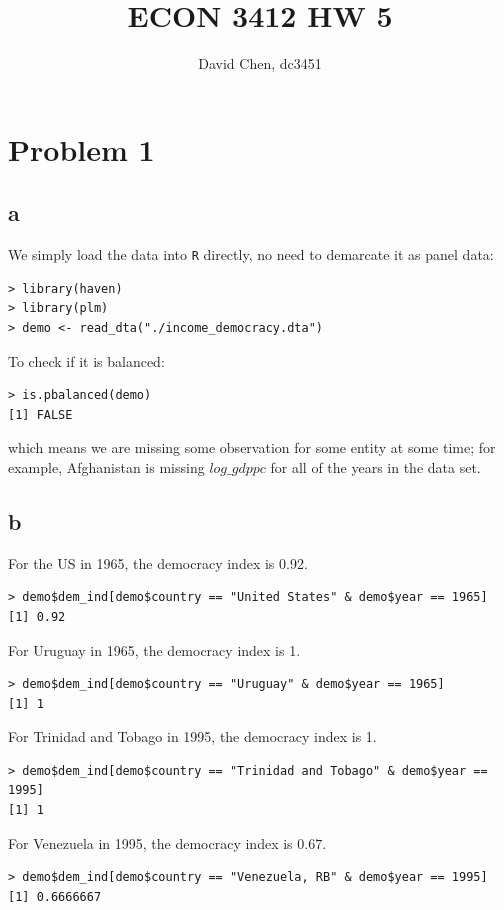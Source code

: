 \documentclass[12pt,letterpaper]{article}
\title{ECON 3412 HW 5}
\author{David Chen, dc3451}
\theoremstyle{definition}
\begin{document}
\maketitle

\section*{Problem 1}

\subsection*{a}

We simply load the data into \verb|R| directly, no need to demarcate it as panel data:
\begin{Verbatim}[fontsize=\small]
> library(haven)
> library(plm)
> demo <- read_dta("./income_democracy.dta")
\end{Verbatim}
To check if it is balanced:
\begin{Verbatim}[fontsize=\small]
> is.pbalanced(demo)
[1] FALSE
\end{Verbatim}
which means we are missing some observation for some entity at some time; for example, Afghanistan is missing $log\_gdppc$ for all of the years in the data set.

\subsection*{b}

For the US in 1965, the democracy index is 0.92.
\begin{Verbatim}[fontsize=\small]
> demo$dem_ind[demo$country == "United States" & demo$year == 1965]
[1] 0.92
\end{Verbatim}

For Uruguay in 1965, the democracy index is 1.
\begin{Verbatim}[fontsize=\small]
> demo$dem_ind[demo$country == "Uruguay" & demo$year == 1965]
[1] 1
\end{Verbatim}

For Trinidad and Tobago in 1995, the democracy index is 1.
\begin{Verbatim}[fontsize=\small]
> demo$dem_ind[demo$country == "Trinidad and Tobago" & demo$year == 1995]
[1] 1
\end{Verbatim}

For Venezuela in 1995, the democracy index is $0.67$.
\begin{Verbatim}[fontsize=\small]
> demo$dem_ind[demo$country == "Venezuela, RB" & demo$year == 1995]
[1] 0.6666667
\end{Verbatim}
\end{document}
